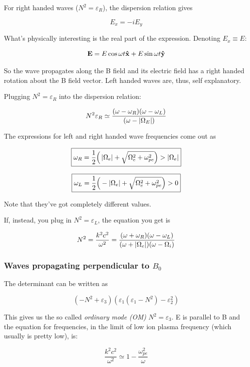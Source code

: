 \documentclass[PlasmaNotes.tex]{subfiles}
\begin{document}
For right handed waves ($N^2 = \varepsilon_R$), the dispersion relation gives

\[ E_x = -i E_y \]

What's physically interesting is the real part of the expression. Denoting $E_x \equiv E$:

\[ \mathbf{E} = E \cos{\omega t} \mathbf{\hat{x}} + E \sin{\omega t} \mathbf{\hat{y}} \] 

So the wave propagates along the B field and its electric field has a right handed rotation about the B field vector. Left handed waves are, thus, self explanatory.

Plugging $ N^2 = \varepsilon_R $ into the dispersion relation:

\[ N^2 \varepsilon_R \simeq \frac{(\omega-\omega_R)(\omega-\omega_L)}{(\omega-\left| \Omega_E \right|)} \]

The expressions for left and right handed wave frequencies come out as

\begin{equation}
\boxed{ \omega_R = \frac{1}{2} \Big(\left| \Omega_e \right| + \sqrt{\Omega_e^2 + \omega_{pe}^2} \Big) > \left| \Omega_e \right| }
\end{equation}

\begin{equation}
\boxed{ \omega_L = \frac{1}{2} \Big(-\left| \Omega_e \right| + \sqrt{\Omega_e^2 + \omega_{pe}^2} \Big) > 0  }
\end{equation}

Note that they've got completely different values.

If, instead, you plug in $N^2 = \varepsilon_L$, the equation you get is

\[ N^2 = \frac{k^2c^2}{\omega^2} = \frac{(\omega+\omega_R)(\omega-\omega_L)}{(\omega+\left| \Omega_e \right|)(\omega-\Omega_i)} \]


\subsubsection{Waves propagating perpendicular to $B_0$}

The determinant can be written as

\[ (-N^2+\varepsilon_3)(\varepsilon_1(\varepsilon_1-N^2)-\varepsilon_2^2) \]

This gives us the so called \emph{ordinary mode (OM)} $N^2 = \varepsilon_3$. E is parallel to B and the equation for frequencies, in the limit of low ion plasma frequency (which usually is pretty low), is:

\[ \frac{k^2c^2}{\omega^2} \simeq 1-\frac{\omega_{pe}^2}{\omega} \]
\end{document}
